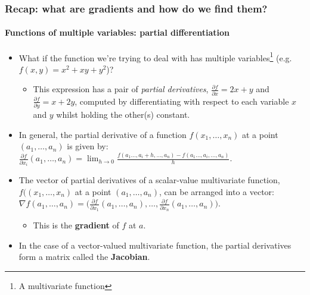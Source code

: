 \documentclass{beamer}
\begin{document}
\begin{frame}
\frametitle{Recap: what are gradients and how do we find them?}
\framesubtitle{Functions of multiple variables: partial differentiation}

\begin{itemize}
	\item What if the function we're trying to deal with has multiple variables\footnote{A multivariate function} (e.g. $f(x, y) = x^2 + xy + y^2$)?
	\begin{itemize}
		\item<+-> This expression has a pair of \emph{partial derivatives}, $\frac{\partial f}{\partial x} = 2x+y$ and $\frac{\partial f}{\partial y} = x + 2y$, computed by differentiating with respect to each variable $x$ and $y$ whilst holding the other(s) constant.
	\end{itemize}
	\item<+-> In general, the partial derivative of a function $f(x_1,\dots,x_n)$ at a point $(a_1,\dots,a_n)$ is given by: \\ $\frac{\partial f}{\partial x_i}(a_1,\dots,a_n) = \lim_{h\to0}\frac{f(a_1\dots,a_i+h,\dots,a_n)-f(a_1\dots,a_i,\dots,a_n)}{h}$.
	\item<+-> The vector of partial derivatives of a scalar-value multivariate function, $f((x_1,\dots,x_n)$ at a point $(a_1,\dots,a_n)$, can be arranged into a vector:
	$\nabla f(a_1,\dots,a_n) = \big(\frac{\partial f}{\partial x_1}(a_1,\dots,a_n), \dots, \frac{\partial f}{\partial x_n}(a_1,\dots,a_n) \big)$.
	\begin{itemize}
		\item<+-> This is the \textbf{gradient} of $f$ at $a$.
	\end{itemize}
	\item<+-> In the case of a vector-valued multivariate function, the partial derivatives form a matrix called the \textbf{Jacobian}.
\end{itemize}
\end{frame}
\end{document}
